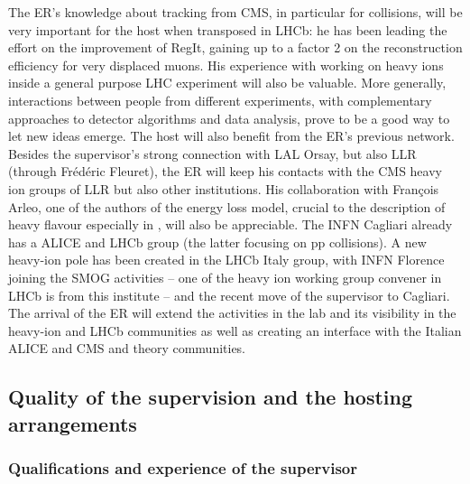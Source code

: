 \documentclass[a4paper,11pt]{article}
\newcommand{\ER}{ER\xspace}
\newcommand{\supervisor}{the supervisor\xspace}
\begin{document}
The \ER's knowledge about tracking from CMS, in particular for \pbpb collisions, will be very important for the host when transposed in LHCb: he has been leading the effort on the improvement of RegIt, gaining up to a factor 2 on the reconstruction efficiency for very displaced muons. His experience with working on heavy ions inside a general purpose LHC experiment will also be valuable. More generally, interactions between people from different experiments, with complementary approaches to detector algorithms and data analysis, prove to be a good way to let new ideas emerge. 
%
The host will also benefit from the \ER's previous network. Besides \supervisor's strong connection with LAL Orsay, but also LLR (through Frédéric Fleuret), the \ER will keep his contacts with the CMS heavy ion groups of LLR but also other institutions. His collaboration with François Arleo, one of the authors of the energy loss model, crucial to the description of heavy flavour especially in \ppb, will also be appreciable.
%
The INFN Cagliari already has a ALICE and LHCb group (the latter
focusing on pp collisions). A new heavy-ion pole has been created in the
LHCb Italy group, with INFN Florence joining the SMOG activities -- one 
of the heavy ion working group convener in LHCb is from this institute --
and the recent move of \supervisor to Cagliari. The arrival of the 
\ER will extend the activities in the lab and its visibility in
the heavy-ion and LHCb communities as well as creating an
interface with the Italian ALICE and CMS and theory communities.



%           

\subsection{Quality of the supervision and the hosting arrangements} 
\label{sec:supervision}

\subsubsection{Qualifications and experience of the supervisor}

% 
\end{document}
